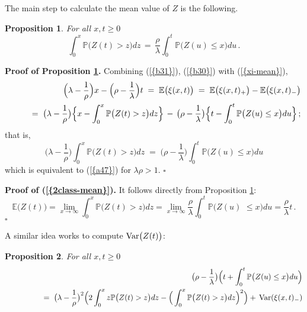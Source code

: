 \documentclass[reqno, 12pt]{amsart}
\newtheorem{proposition}{Proposition}
\begin{document}
The main step to calculate the mean value of $Z$ is the following.
\begin{proposition}\label{normal-1}
For all $x,t\geq 0$
\begin{equation}
  \label{a47}
\int_0^x{{\mathbb P}}\big(Z(t)>z\big)dz\,=\,\frac{\rho}{\lambda}\int_0^t{{\mathbb P}}\big(Z(u)\leq
x\big)du\,.
\end{equation}
\end{proposition}
{{\noindent \bf Proof of {Proposition \ref{normal-1}}.}} Combining {(\ref{{b31}})}, {(\ref{{b30}})} with
{(\ref{{xi-mean}})},
\begin{eqnarray}
  \label{a46}
  &&\Bigl(\lambda-\frac{1}{\rho}\Bigr)x - \Bigl(\rho-\frac1\lambda\Bigr)t
  \;=\;{{\mathbb E}}\big(\xi(x,t)\big)
  \;=\;{{\mathbb E}}\big(\xi(x,t)_+\big)-{{\mathbb E}}\big(\xi(x,t)_-\big)\nonumber\\
  &&\qquad=\;\big(\lambda-\frac{1}{\rho}\big)\Big\{x-\int_0^x{{\mathbb P}}\big(Z(t)> z\big)dz\Big\}\,-\, \big(\rho-\frac{1}{\lambda}\big)\Big\{t-\int_0^t{{\mathbb P}}\big(Z(u) \leq
  x\big)du\Big\}\,;\nonumber
\end{eqnarray}
that is,
\begin{equation}
  \label{a48}
  \big(\lambda-\frac{1}{\rho}\big)\int_0^x{{\mathbb P}}\big(Z(t)> z\big)dz\;=\; \big(\rho-\frac{1}{\lambda}\big)\int_0^t{{\mathbb P}}\big(Z(u) \leq
  x\big)du
\end{equation}
which is equivalent to {(\ref{{a47}})} for $\lambda\rho> 1$.
{$\square$ \vskip 2mm}

{{\noindent \bf Proof of {{(\ref{{2class-mean}})}}.}}
It follows directly from Proposition \ref{normal-1}:
\[
{{\mathbb E}}\big(Z(t)\big)
=\lim_{x\to\infty}\int_0^x{{\mathbb P}}\big(Z(t)>z\big)dz
=\lim_{x\to\infty}\frac{\rho}{\lambda}\int_0^t{{\mathbb P}}\big(Z(u)\,\,\leq x\big)du
=\frac{\rho}{\lambda}t\,.
\]
{$\square$ \vskip 2mm}

A similar idea works to compute ${{\rm Var}} \big(Z(t)\big)$:
\begin{proposition}\label{normal-2}
For all $x,t\geq 0$
\begin{eqnarray}
  \label{f8}
  &&\big(\rho-\frac{1}{\lambda}\big)\Big(t+\int_0^t{{\mathbb P}}\big(Z(u)\le x\big)du\Big)
  \\
  && \qquad\qquad =\; \big(\lambda-\frac{1}{\rho}\big)^2\Big(2\int_0^x z
  {{\mathbb P}}\big(Z(t)> z\big)dz-\Big(\int_0^x{{\mathbb P}}\big(Z(t)>z\big)dz\Big)^2\Big)+\, {{\rm Var}}(\xi(x,t)_-)\nonumber
\end{eqnarray}
\end{proposition}
\end{document}
